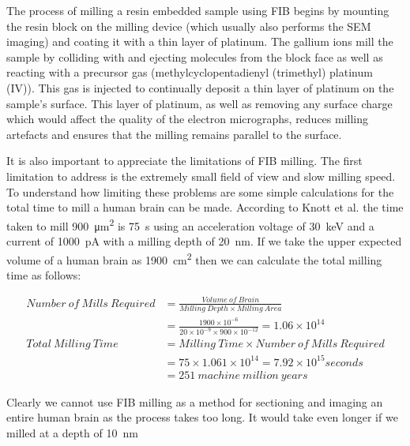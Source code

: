\documentclass[a4paper, 11pt]{article}
\numberwithin{equation}{section}
\begin{document}
	The process of milling a resin embedded sample using FIB begins by mounting the resin block on the milling device (which usually also performs the SEM imaging) and coating it with a thin layer of platinum. The gallium ions mill the sample by colliding with and ejecting molecules from the block face as well as reacting with a precursor gas (methylcyclopentadienyl (trimethyl) platinum (IV)). This gas is injected to continually deposit a thin layer of platinum on the sample's surface. This layer of platinum, as well as removing any surface charge which would affect the quality of the electron micrographs, reduces milling artefacts and ensures that the milling remains parallel to the surface\cite{heymann2006site}. 
	
	It is also important to appreciate the limitations of FIB milling. The first limitation to address is the extremely small field of view and slow milling speed. To understand how limiting these problems are some simple calculations for the total time to mill a human brain can be made. According to Knott et al. \cite{knott2008serial} the time taken to mill \SI{900}{\micro\metre\squared} is \SI{75}{\second} using an acceleration voltage of \SI{30}{\kilo\electronvolt} and a current of \SI{1000}{\pico\ampere} with a milling depth of \SI{20}{\nano\metre}. If we take the upper expected volume of a human brain as \SI{1900}{\centi\metre\squared}\cite{cosgrove2007evolving} then we can calculate the total milling time as follows:
	
	\begin{align}
	Number\ of\ Mills\ Required &= \frac{Volume\ of\ Brain}{Milling\ Depth \times Milling\ Area} \nonumber \\
	&= \frac{1900\times10^{-6}}{20\times10^{-9} \times 900\times10^{-12}} = 1.06\times10^{14} \nonumber \\
	Total\ Milling\ Time &= Milling\ Time \times Number\ of\ Mills\ Required \nonumber \\
	&= 75 \times 1.061\times10^{14} = 7.92\times10^{15} seconds \nonumber \\
	&= 251\ machine\ million\ years
	\end{align}
	
	Clearly we cannot use FIB milling as a method for sectioning and imaging an entire human brain as the process takes too long. It would take even longer if we milled at a depth of \SI{10}{\nano\meter}
	
\end{document}
